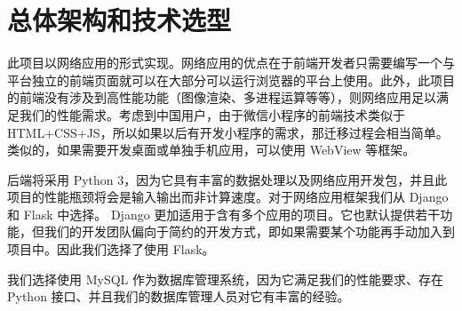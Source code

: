 \section{总体架构和技术选型}

此项目以网络应用的形式实现。网络应用的优点在于前端开发者只需要编写一个与平台独立的前端页面就可以在大部分可以运行浏览器的平台上使用。此外，此项目的前端没有涉及到高性能功能（图像渲染、多进程运算等等），则网络应用足以满足我们的性能需求。考虑到中国用户，由于微信小程序的前端技术类似于 HTML+CSS+JS，所以如果以后有开发小程序的需求，那迁移过程会相当简单。类似的，如果需要开发桌面或单独手机应用，可以使用 WebView 等框架。

后端将采用 Python 3，因为它具有丰富的数据处理以及网络应用开发包，并且此项目的性能瓶颈将会是输入输出而非计算速度。对于网络应用框架我们从 Django 和 Flask 中选择。 Django 更加适用于含有多个应用的项目。它也默认提供若干功能，但我们的开发团队偏向于简约的开发方式，即如果需要某个功能再手动加入到项目中。因此我们选择了使用 Flask。

我们选择使用 MySQL 作为数据库管理系统，因为它满足我们的性能要求、存在 Python 接口、并且我们的数据库管理人员对它有丰富的经验。